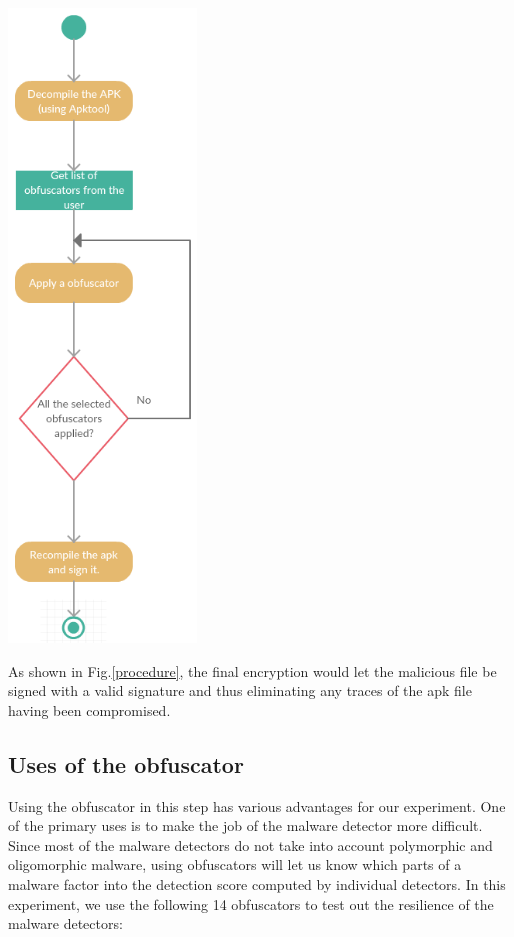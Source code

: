   \vspace{3mm}
  \begin{center}
  	\includegraphics[width=50mm]{procedure.png}
  	\label{procedure}
  \end{center}
  \vspace{3mm}
  
 As shown in Fig.\ref{procedure}, the final encryption would let the malicious file be signed with a valid signature and thus eliminating any traces of the apk file having been compromised.
 
\subsection{Uses of the obfuscator}

Using the obfuscator in this step has various advantages for our experiment. One of the primary uses is to make the job of the malware detector more difficult. Since most of the malware detectors do not take into account polymorphic and oligomorphic malware, using obfuscators will let us know which parts of a malware factor into the detection score computed by individual detectors. In this experiment, we use the following 14 obfuscators to test out the resilience of the malware detectors:

